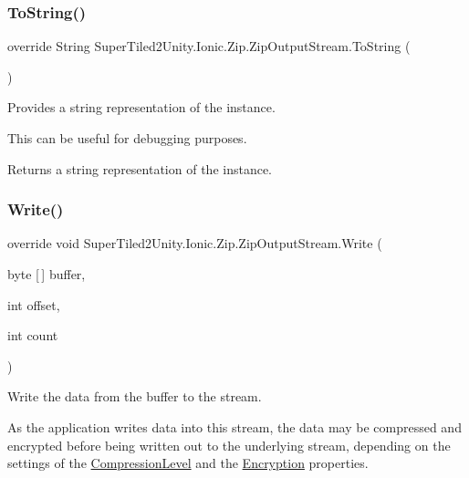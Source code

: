 \subsubsection{\texorpdfstring{To\+String()}{ToString()}}
{\footnotesize\ttfamily override String Super\+Tiled2\+Unity.\+Ionic.\+Zip.\+Zip\+Output\+Stream.\+To\+String (\begin{DoxyParamCaption}{ }\end{DoxyParamCaption})}



Provides a string representation of the instance.

This can be useful for debugging purposes. 

\begin{DoxyReturn}{Returns}
a string representation of the instance.
\end{DoxyReturn}
\mbox{\label{class_super_tiled2_unity_1_1_ionic_1_1_zip_1_1_zip_output_stream_a8cd95df92691b8f266216f1d6984dfec}} 
\subsubsection{\texorpdfstring{Write()}{Write()}}
{\footnotesize\ttfamily override void Super\+Tiled2\+Unity.\+Ionic.\+Zip.\+Zip\+Output\+Stream.\+Write (\begin{DoxyParamCaption}\item[{byte \mbox{[}$\,$\mbox{]}}]{buffer,  }\item[{int}]{offset,  }\item[{int}]{count }\end{DoxyParamCaption})}



Write the data from the buffer to the stream. 

As the application writes data into this stream, the data may be compressed and encrypted before being written out to the underlying stream, depending on the settings of the \mbox{\hyperlink{class_super_tiled2_unity_1_1_ionic_1_1_zip_1_1_zip_output_stream_ab18e466bb7d16f7131c5a543cb9a3453}{Compression\+Level}} and the \mbox{\hyperlink{class_super_tiled2_unity_1_1_ionic_1_1_zip_1_1_zip_output_stream_af1e123174110807666b7c4df62959112}{Encryption}} properties. 


